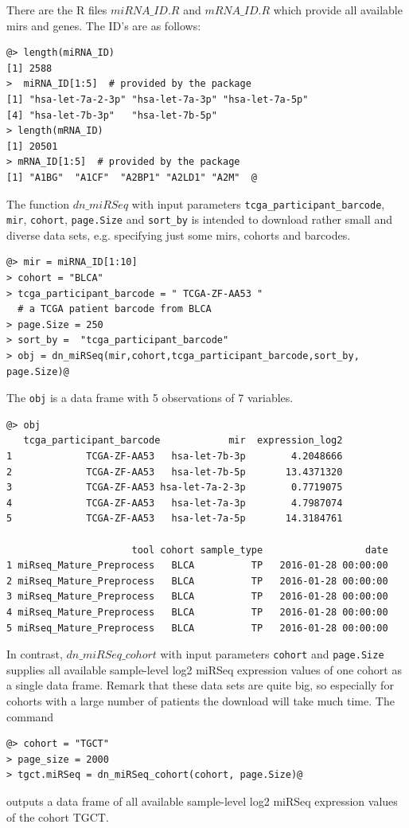 \documentclass{TechReport}
\begin{document}
 There are the R files $miRNA\_ID.R$ and $mRNA\_ID.R$ which provide
 all available mirs and genes. The ID's are as follows:
\begin{lstlisting}[style=base]
@> length(miRNA_ID)
[1] 2588
>  miRNA_ID[1:5]  # provided by the package
[1] "hsa-let-7a-2-3p" "hsa-let-7a-3p" "hsa-let-7a-5p" 
[4] "hsa-let-7b-3p"   "hsa-let-7b-5p"         
> length(mRNA_ID)
[1] 20501
> mRNA_ID[1:5]  # provided by the package
[1] "A1BG"  "A1CF"  "A2BP1" "A2LD1" "A2M"  @
\end{lstlisting}
The function $dn\_miRSeq$ with input parameters  {\tt tcga\_participant\_barcode},
{\tt mir}, {\tt cohort}, {\tt page.Size} and {\tt sort\_by} is intended to download 
rather small and diverse data sets, e.g. specifying just some mirs, cohorts and
barcodes.
\begin{lstlisting}[style=base]
@> mir = miRNA_ID[1:10]
> cohort = "BLCA"
> tcga_participant_barcode = " TCGA-ZF-AA53 "  
  # a TCGA patient barcode from BLCA
> page.Size = 250 
> sort_by =  "tcga_participant_barcode"
> obj = dn_miRSeq(mir,cohort,tcga_participant_barcode,sort_by, 
page.Size)@
\end{lstlisting}
The {\tt obj} is a data frame with 5 observations of 7 variables.
\begin{lstlisting}[style=base]
@> obj
   tcga_participant_barcode            mir  expression_log2
1             TCGA-ZF-AA53   hsa-let-7b-3p        4.2048666
2             TCGA-ZF-AA53   hsa-let-7b-5p       13.4371320
3             TCGA-ZF-AA53 hsa-let-7a-2-3p        0.7719075
4             TCGA-ZF-AA53   hsa-let-7a-3p        4.7987074
5             TCGA-ZF-AA53   hsa-let-7a-5p       14.3184761

                      tool cohort sample_type                  date         
1 miRseq_Mature_Preprocess   BLCA          TP   2016-01-28 00:00:00
2 miRseq_Mature_Preprocess   BLCA          TP   2016-01-28 00:00:00
3 miRseq_Mature_Preprocess   BLCA          TP   2016-01-28 00:00:00
4 miRseq_Mature_Preprocess   BLCA          TP   2016-01-28 00:00:00
5 miRseq_Mature_Preprocess   BLCA          TP   2016-01-28 00:00:00
\end{lstlisting}
In contrast, $dn\_miRSeq\_cohort$ with input parameters {\tt cohort}
and {\tt page.Size} supplies all available sample-level log2 miRSeq
expression values of one cohort as a single data frame.  Remark that
these data sets are quite big, so especially for cohorts with a large
number of patients the download will take much time. The command
\begin{lstlisting}[style=base]
@> cohort = "TGCT"
> page_size = 2000
> tgct.miRSeq = dn_miRSeq_cohort(cohort, page.Size)@
\end{lstlisting}
outputs a data frame of all available sample-level log2 miRSeq expression values of
the cohort TGCT.
\end{document}
